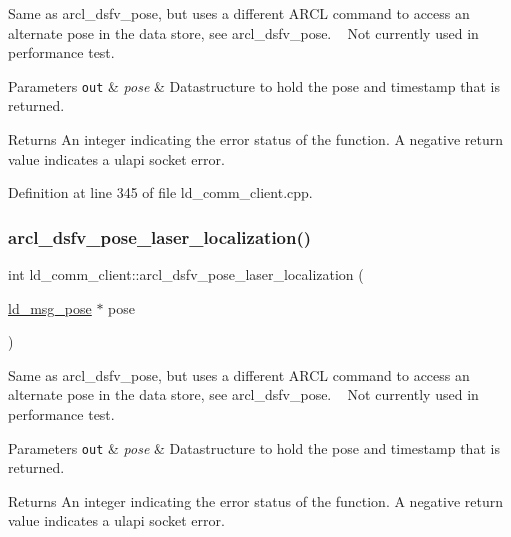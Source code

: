 Same as arcl\+\_\+dsfv\+\_\+pose, but uses a different A\+R\+CL command to access an alternate pose in the data store, see arcl\+\_\+dsfv\+\_\+pose. ~\newline
Not currently used in performance test. 
\begin{DoxyParams}[1]{Parameters}
\mbox{\tt out}  & {\em pose} & Datastructure to hold the pose and timestamp that is returned. \\
\hline
\end{DoxyParams}
\begin{DoxyReturn}{Returns}
An integer indicating the error status of the function. A negative return value indicates a ulapi socket error. 
\end{DoxyReturn}


Definition at line 345 of file ld\+\_\+comm\+\_\+client.\+cpp.

\mbox{\label{classld__comm__client_ac1520245a4281887fc5442933d519bf9}} 
\subsubsection{\texorpdfstring{arcl\+\_\+dsfv\+\_\+pose\+\_\+laser\+\_\+localization()}{arcl\_dsfv\_pose\_laser\_localization()}}
{\footnotesize\ttfamily int ld\+\_\+comm\+\_\+client\+::arcl\+\_\+dsfv\+\_\+pose\+\_\+laser\+\_\+localization (\begin{DoxyParamCaption}\item[{\mbox{\hyperlink{structld__msg__pose}{ld\+\_\+msg\+\_\+pose}} $\ast$}]{pose }\end{DoxyParamCaption})}

Same as arcl\+\_\+dsfv\+\_\+pose, but uses a different A\+R\+CL command to access an alternate pose in the data store, see arcl\+\_\+dsfv\+\_\+pose. ~\newline
Not currently used in performance test. 
\begin{DoxyParams}[1]{Parameters}
\mbox{\tt out}  & {\em pose} & Datastructure to hold the pose and timestamp that is returned. \\
\hline
\end{DoxyParams}
\begin{DoxyReturn}{Returns}
An integer indicating the error status of the function. A negative return value indicates a ulapi socket error. 
\end{DoxyReturn}


